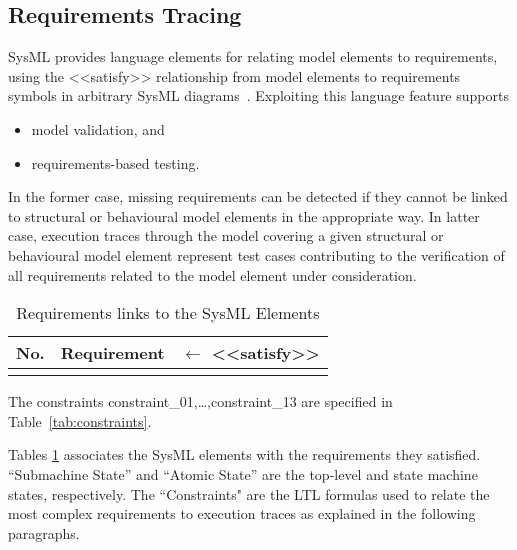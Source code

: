 \newpage
\subsection{Requirements Tracing} 
SysML provides language elements for relating model elements to requirements, using the {\sf <<satisfy>>} relationship from model elements to requirements symbols in arbitrary SysML diagrams~\cite[Section~16]{SysML12}. Exploiting this language feature supports
\begin{itemize}
\item model validation, and
\item requirements-based testing.
\end{itemize}
In the former case, missing requirements can be detected if they
cannot be linked to structural or behavioural model elements in the
appropriate way. In latter case, execution traces through the model covering a
given structural or behavioural model element represent test cases
contributing to the verification of all requirements related to the
model element under consideration. 



\begin{table}[htbp]
\caption{Requirements links to the SysML Elements}
\scriptsize
\begin{center}
\begin{tabular}{|r|l|l|}
\hline\hline
{\bf No.} & {\bf Requirement} & $\longleftarrow$ {\sf <<satisfy>>}
\\\hline\hline

\\\hline\hline
\end{tabular}
\end{center}

\hspace*{15mm}
The constraints constraint\_01,\ldots,constraint\_13 are specified in Table~\ref{tab:constraints}.
\normalsize
\label{table:req-tracing} 
\end{table}

Tables \ref{table:req-tracing} associates 
the SysML elements with the requirements they satisfied.  ``Submachine
State'' and  ``Atomic State'' are the top-level and state machine
states, respectively. The ``Constraints" are the LTL formulas used to
relate the most complex requirements to execution traces as explained in the following paragraphs.
 

